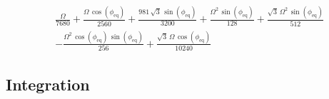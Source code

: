 \begin{equation}
    \begin{split}
        &\frac{\Omega }{7680}+\frac{\Omega \,\cos\left(\phi _{\mathrm{eq}}\right)}{2560}+\frac{981\,\sqrt{3}\,\sin\left(\phi _{\mathrm{eq}}\right)}{3200}+\frac{\Omega ^2\,\sin\left(\phi _{\mathrm{eq}}\right)}{128}+\frac{\sqrt{3}\,\Omega ^2\,\sin\left(\phi _{\mathrm{eq}}\right)}{512}\\
        &-\frac{\Omega ^2\,\cos\left(\phi _{\mathrm{eq}}\right)\,\sin\left(\phi _{\mathrm{eq}}\right)}{256}+\frac{\sqrt{3}\,\Omega \,\cos\left(\phi _{\mathrm{eq}}\right)}{10240}
    \end{split}
\end{equation}

\subsection{Integration}

